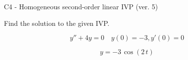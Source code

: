 \begin{exercise}
  \begin{exerciseTitle}C4 - Homogeneous second-order linear IVP (ver. 5)\end{exerciseTitle}
  \begin{exerciseStatement}
    
Find the solution to the given IVP.

    
\[y''+4y = 0 \hspace{1em} y(0) = -3 , y'(0) = 0\]

  \end{exerciseStatement}
  \begin{exerciseAnswer}
    
\[y= -3 \, \cos\left(2 \, t\right)\]

  \end{exerciseAnswer}
\end{exercise}